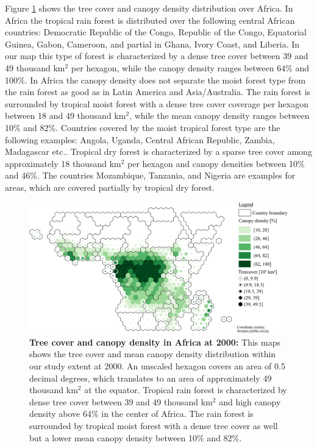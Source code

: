 			Figure \ref{fig:africa_tree_cover} shows the tree cover and canopy density distribution over Africa. In Africa the tropical rain forest is distributed over the following central African countries: Democratic Republic of the Congo, Republic of the Congo, Equatorial Guinea, Gabon, Cameroon, and partial in Ghana, Ivory Coast, and Liberia. In our map this type of forest is characterized by a dense tree cover between 39 and 49 thousand km$^2$ per hexagon, while the canopy density ranges between 64\% and 100\%. In Africa the canopy density does not separate the moist forest type from the rain forest as good as in Latin America and Asia/Australia. The rain forest is surrounded by tropical moist forest with a dense tree cover coverage per hexagon between 18 and 49 thousand km$^2$, while the mean canopy density ranges between 10\% and 82\%. Countries covered by the moist tropical forest type are the following examples: Angola, Uganda, Central African Republic, Zambia, Madagascar etc.. Tropical dry forest is characterized by a sparse tree cover among approximately 18 thousand km$^2$ per hexagon and canopy densities between 10\% and 46\%. The countries Mozambique, Tanzania, and Nigeria are examples for areas, which are covered partially by tropical dry forest.
			\begin{figure}[ht]
				\centering
				\includegraphics[scale=1.]{img/africa_treecover_frameless}
				\caption[Tree cover and canopy density in Africa at 2000]{\textbf{Tree cover and canopy density in Africa at 2000:} This maps shows the tree cover and mean canopy density distribution within our study extent at 2000. An unscaled hexagon covers an area of 0.5 decimal degrees, which translates to an area of approximately 49 thousand km$^2$ at the equator. Tropical rain forest is characterized by dense tree cover between 39 and 49 thousand km$^2$ and high canopy density above 64\% in the center of Africa. The rain forest is surrounded by tropical moist forest with a dense tree cover as well but a lower mean canopy density between 10\% and 82\%.}
				\label{fig:africa_tree_cover}
			\end{figure}

